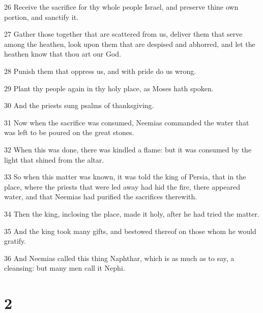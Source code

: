 \par 26 Receive the sacrifice for thy whole people Israel, and preserve thine own portion, and sanctify it.
\par 27 Gather those together that are scattered from us, deliver them that serve among the heathen, look upon them that are despised and abhorred, and let the heathen know that thou art our God.
\par 28 Punish them that oppress us, and with pride do us wrong.
\par 29 Plant thy people again in thy holy place, as Moses hath spoken.
\par 30 And the priests sung psalms of thanksgiving.
\par 31 Now when the sacrifice was consumed, Neemias commanded the water that was left to be poured on the great stones.
\par 32 When this was done, there was kindled a flame: but it was consumed by the light that shined from the altar.
\par 33 So when this matter was known, it was told the king of Persia, that in the place, where the priests that were led away had hid the fire, there appeared water, and that Neemias had purified the sacrifices therewith.
\par 34 Then the king, inclosing the place, made it holy, after he had tried the matter.
\par 35 And the king took many gifts, and bestowed thereof on those whom he would gratify.
\par 36 And Neemias called this thing Naphthar, which is as much as to say, a cleansing: but many men call it Nephi.

\chapter{2}

